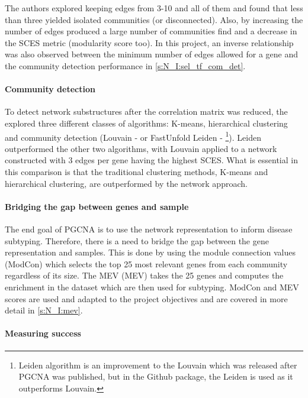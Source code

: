 The authors explored keeping edges from 3-10 and all of them and found that less than three yielded isolated communities (or disconnected). Also, by increasing the number of edges produced a large number of communities find and a decrease in the SCES metric (modularity score too). In this project, an inverse relationship was also observed between the minimum number of edges allowed for a gene and the community detection performance in \cref{s:N_I:sel_tf_com_det}.

\paragraph*{Community detection}

To detect network substructures after the correlation matrix was reduced, the \citet{Care2019-ij} explored three different classes of algorithms: K-means, hierarchical clustering and community detection (Louvain - \cite{Blondel2008-ik} or FastUnfold Leiden - \cite{Traag2019-ne}\footnote{Leiden algorithm is an improvement to the Louvain which was released after PGCNA was published, but in the Github package, the Leiden is used as it outperforms Louvain.}). Leiden outperformed the other two algorithms, with Louvain applied to a network constructed with 3 edges per gene having the highest SCES. What is essential in this comparison is that the traditional clustering methods, K-means and hierarchical clustering, are outperformed by the network approach.

\paragraph*{Bridging the gap between genes and sample}

The end goal of PGCNA is to use the network representation to inform disease subtyping. Therefore, there is a need to bridge the gap between the gene representation and samples. This is done by using the module connection values (ModCon) which selects the top 25 most relevant genes from each community regardless of its size. The \gls{MEV} (MEV) takes the 25 genes and computes the enrichment in the dataset which are then used for subtyping.  ModCon and MEV scores are used and adapted to the project objectives and are covered in more detail in \cref{s:N_I:mev}.

\paragraph*{Measuring success} 

